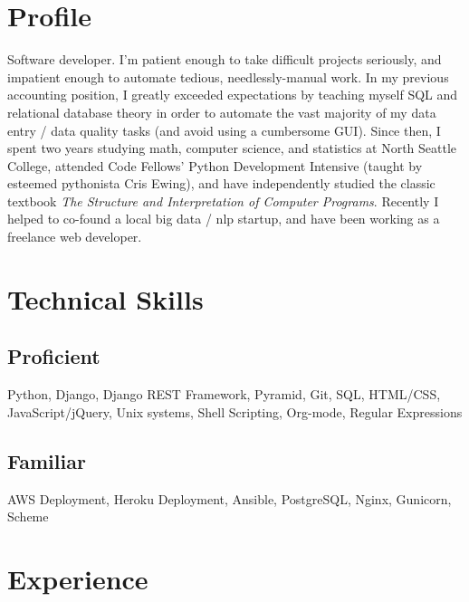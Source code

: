 \documentclass[10pt,a4paper,sans]{moderncv}        %
\begin{document}
\makecvtitle

\section{Profile}
Software developer. I'm patient enough to take difficult projects seriously, and
impatient enough to automate tedious, needlessly-manual work. In my previous
accounting position, I greatly exceeded expectations by teaching myself SQL and
relational database theory in order to automate the vast majority of my data
entry / data quality tasks (and avoid using a cumbersome GUI). Since then, I
spent two years studying math, computer science, and statistics at North Seattle
College, attended Code Fellows' Python Development Intensive (taught by esteemed
pythonista Cris Ewing), and have independently studied the classic textbook
\textit{The Structure and Interpretation of Computer Programs}. Recently I
helped to co-found a local big data / nlp startup, and have been working as a
freelance web developer.

\section{Technical Skills}
\subsection{Proficient}
Python, Django, Django REST Framework, Pyramid, Git, SQL, HTML/CSS,
JavaScript/jQuery, Unix systems, Shell Scripting, Org-mode, Regular Expressions
\subsection{Familiar}
AWS Deployment, Heroku Deployment, Ansible, PostgreSQL, Nginx, Gunicorn, Scheme

\section{Experience}

\begin{comment}
\cventry
{date - date}
{Employer}
{Job Title}
{}
{City, State}
{Description of work
    \begin{itemize}
    \item specific achievement
    \item specific achievement
    \end{itemize}}
\end{comment}
\end{document}
